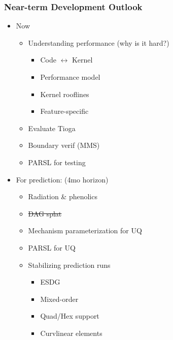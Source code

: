 \begin{frame}\frametitle{Near-term Development Outlook}
\begin{multicols}{2}
\begin{itemize}
\item Now
  \begin{itemize}
  \item Understanding performance (why is it hard?)
    \begin{itemize}
    \item Code $\leftrightarrow$ Kernel 
    \item Performance model
    \item Kernel rooflines 
    \item Feature-specific
    \end{itemize}
  \item Evaluate Tioga
  \item Boundary verif (MMS)
  \item PARSL for testing 
  \end{itemize}
\end{itemize}
\columnbreak
\begin{itemize}
\item For prediction: (4mo horizon)
  \begin{itemize}
  \item Radiation \& phenolics 
  \item \sout{DAG splat} 
  \item Mechanism parameterization for UQ
  \item PARSL for UQ 
  \item Stabilizing prediction runs 
    \begin{itemize}
    \item ESDG 
    \item Mixed-order
    \item Quad/Hex support 
    \item Curvlinear elements
    \end{itemize}
  \end{itemize}
\end{itemize}
\end{multicols}
\end{frame}

